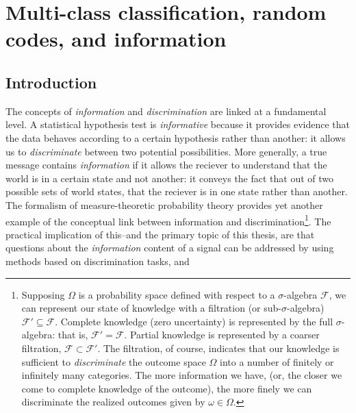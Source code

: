 
\chapter{Multi-class classification, random codes, and information} %

\label{Chapter1} %


\newcommand{\keyword}[1]{\textbf{#1}}
\newcommand{\tabhead}[1]{\textbf{#1}}
\newcommand{\code}[1]{\texttt{#1}}
\newcommand{\file}[1]{\texttt{\bfseries#1}}
\newcommand{\option}[1]{\texttt{\itshape#1}}



\section{Introduction}

The concepts of \emph{information} and \emph{discrimination} are
linked at a fundamental level.  A statistical hypothesis test is
\emph{informative} because it provides evidence that the data behaves
according to a certain hypothesis rather than another: it allows us to
\emph{discriminate} between two potential possibilities.  More
generally, a true message contains \emph{information} if it allows the
reciever to understand that the world is in a certain state and not
another: it conveys the fact that out of two possible sets of world
states, that the reciever is in one state rather than another.  The
formalism of measure-theoretic probability theory provides yet another
example of the conceptual link between information and
discrimination\footnote{Supposing $\Omega$ is a probability space
  defined with respect to a $\sigma$-algebra $\mathcal{F}$, we can
  represent our state of knowledge with a filtration (or
  sub-$\sigma$-algebra) $\mathcal{F}' \subseteq \mathcal{F}$.
  Complete knowledge (zero uncertainty) is represented by the full
  $\sigma$-algebra: that is, $\mathcal{F}' = \mathcal{F}$.  Partial
  knowledge is represented by a coarser filtration, $\mathcal{F}
  \subset \mathcal{F}'$.  The filtration, of course, indicates that
  our knowledge is sufficient to \emph{discriminate} the outcome space
  $\Omega$ into a number of finitely or infinitely many categories.
  The more information we have, (or, the closer we come to complete
  knowledge of the outcome), the more finely we can discriminate the
  realized outcomes given by $\omega \in \Omega$.}.
The practical implication of this--and the primary topic of this thesis, are that questions about the
\emph{information} content of a signal can be addressed by using methods based on discrimination tasks,
and 


